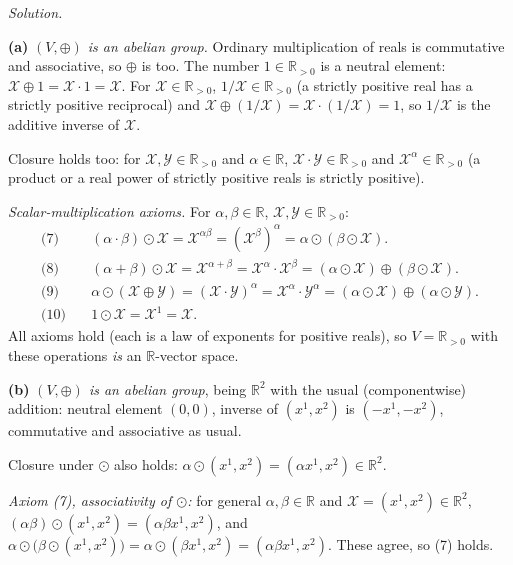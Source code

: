 \documentclass[11pt]{article}
\begin{document}
\medskip
\noindent\textit{Solution.}

\textbf{(a)} \emph{$(V,\oplus)$ is an abelian group.} Ordinary multiplication of reals is commutative and associative, so $\oplus$ is too. The number $1 \in \mathbb{R}_{>0}$ is a neutral element: $\mathcal X \oplus 1 = \mathcal X\cdot 1=\mathcal X$. For $\mathcal X \in \mathbb{R}_{>0}$, $1/\mathcal X \in \mathbb{R}_{>0}$ (a strictly positive real has a strictly positive reciprocal) and $\mathcal X \oplus (1/\mathcal X) = \mathcal X\cdot(1/\mathcal X) = 1$, so $1/\mathcal X$ is the additive inverse of $\mathcal X$.

Closure holds too: for $\mathcal X,\mathcal Y\in\mathbb R_{>0}$ and $\alpha\in\mathbb R$, $\mathcal X\cdot\mathcal Y\in\mathbb R_{>0}$ and $\mathcal X^\alpha\in\mathbb R_{>0}$ (a product or a real power of strictly positive reals is strictly positive).

\emph{Scalar-multiplication axioms.} For $\alpha,\beta\in\mathbb R$, $\mathcal X,\mathcal Y\in\mathbb R_{>0}$:
\begin{align*}
\text{(7)}\quad & (\alpha\cdot\beta)\odot\mathcal X = \mathcal X^{\alpha\beta} = (\mathcal X^\beta)^\alpha = \alpha\odot(\beta\odot\mathcal X). \\
\text{(8)}\quad & (\alpha+\beta)\odot\mathcal X = \mathcal X^{\alpha+\beta} = \mathcal X^\alpha\cdot\mathcal X^\beta = (\alpha\odot\mathcal X)\oplus(\beta\odot\mathcal X). \\
\text{(9)}\quad & \alpha\odot(\mathcal X\oplus\mathcal Y) = (\mathcal X\cdot\mathcal Y)^\alpha = \mathcal X^\alpha\cdot\mathcal Y^\alpha = (\alpha\odot\mathcal X)\oplus(\alpha\odot\mathcal Y). \\
\text{(10)}\quad & 1\odot\mathcal X = \mathcal X^1 = \mathcal X.
\end{align*}
All axioms hold (each is a law of exponents for positive reals), so $V=\mathbb R_{>0}$ with these operations \emph{is} an $\mathbb{R}$-vector space.

\textbf{(b)} \emph{$(V,\oplus)$ is an abelian group}, being $\mathbb{R}^2$ with the usual (componentwise) addition: neutral element $(0,0)$, inverse of $(x^1,x^2)$ is $(-x^1,-x^2)$, commutative and associative as usual.

Closure under $\odot$ also holds: $\alpha\odot(x^1,x^2)=(\alpha x^1,x^2)\in\mathbb R^2$.

\emph{Axiom (7), associativity of $\odot$:} for general $\alpha,\beta\in\mathbb R$ and $\mathcal X=(x^1,x^2)\in\mathbb R^2$, $(\alpha\beta)\odot(x^1,x^2) = (\alpha\beta x^1,x^2)$, and $\alpha\odot\big(\beta\odot(x^1,x^2)\big) = \alpha\odot(\beta x^1,x^2) = (\alpha\beta x^1,x^2)$. These agree, so (7) holds.
\end{document}
